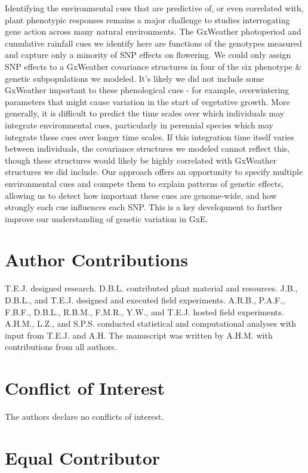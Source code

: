 \documentclass[
  9pt,
  twocolumn,
  twoside]{simple-article}%
\begin{document}
Identifying the environmental cues that are predictive of, or even
correlated with, plant phenotypic responses remains a major challenge to
studies interrogating gene action across many natural environments. The
GxWeather photoperiod and cumulative rainfall cues we identify here are
functions of the genotypes measured and capture only a minority of SNP
effects on flowering. We could only assign SNP effects to a GxWeather
covariance structures in four of the six phenotype \& genetic
subpopulations we modeled. It's likely we did not include some GxWeather
important to these phenological cues - for example, overwintering
parameters that might cause variation in the start of vegetative growth.
More generally, it is difficult to predict the time scales over which
individuals may integrate environmental cues, particularly in perennial
species which may integrate these cues over longer time scales. If this
integration time itself varies between individuals, the covariance
structures we modeled cannot reflect this, though these structures would
likely be highly correlated with GxWeather structures we did include.
Our approach offers an opportunity to specify multiple environmental
cues and compete them to explain patterns of genetic effects, allowing
us to detect how important these cues are genome-wide, and how strongly
each cue influences each SNP. This is a key development to further
improve our understanding of genetic variation in GxE.

\section{Author Contributions}\label{author-contributions}

T.E.J. designed research. D.B.L. contributed plant material and
resources. J.B., D.B.L., and T.E.J. designed and executed field
experiments. A.R.B., P.A.F., F.B.F., D.B.L., R.B.M., F.M.R., Y.W., and
T.E.J. hosted field experiments. A.H.M., L.Z., and S.P.S. conducted
statistical and computational analyses with input from T.E.J. and A.H.
The manuscript was written by A.H.M. with contributions from all
authors.

\section{Conflict of Interest}\label{conflict-of-interest}

The authors declare no conflicts of interest.

\section{Equal Contributor}\label{equal-contributor}
\end{document}
